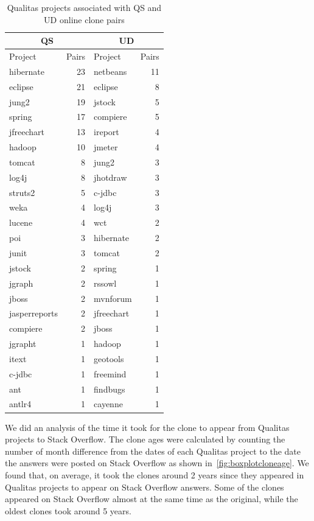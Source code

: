\documentclass[10pt,journal,compsoc]{IEEEtran}
\begin{document}
\begin{table}
	\centering
	\caption{Qualitas projects associated with QS and UD online clone pairs}
	\label{tab:qs_qualitas_projects}
	\begin{tabular}{lrlr}
		\toprule
		\multicolumn{2}{c}{QS} & \multicolumn{2}{c}{UD} \\
		\midrule
		Project & Pairs & Project & Pairs\\
		\midrule
		hibernate & 23 & netbeans & 11 \\
		eclipse & 21 & eclipse & 8 \\
		jung2 & 19 & jstock & 5 \\
		spring & 17 & compiere & 5 \\
		jfreechart & 13 & ireport & 4 \\
		hadoop & 10 & jmeter & 4 \\
		tomcat & 8 & jung2 & 3 \\
		log4j & 8 & jhotdraw & 3 \\
		struts2 & 5 & c-jdbc & 3 \\
		weka & 4 & log4j & 3 \\
		lucene & 4 & wct & 2 \\
		poi & 3 & hibernate & 2 \\
		junit & 3 & tomcat & 2 \\
		jstock & 2 & spring & 1 \\
		jgraph & 2 & rssowl & 1 \\
		jboss & 2 & mvnforum & 1 \\
		jasperreports & 2 & jfreechart & 1 \\
		compiere & 2 & jboss & 1 \\
		jgrapht & 1 & hadoop & 1 \\
		itext & 1 & geotools & 1 \\
		c-jdbc & 1 & freemind & 1 \\
		ant & 1 & findbugs & 1 \\
		antlr4 & 1 & cayenne & 1 \\
		\bottomrule
	\end{tabular} 
\end{table}

We did an analysis of the time it took for the clone to appear from Qualitas
projects to Stack Overflow. The clone ages were calculated by counting the
number of month difference from the dates of each Qualitas project to the date
the answers were posted on Stack Overflow as shown in~\ref{fig:boxplotcloneage}.
We found that, on average, it took the clones around 2 years since they appeared
in Qualitas projects to appear on Stack Overflow answers. Some of the clones
appeared on Stack Overflow almost at the same time as the original, while the
oldest clones took around 5 years.
\end{document}
